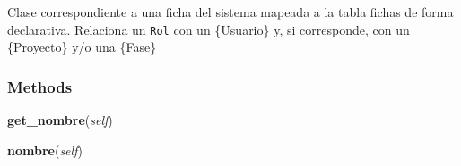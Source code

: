 Clase correspondiente a una ficha del sistema mapeada a la tabla fichas de 
forma declarativa. Relaciona un \texttt{Rol} con un \{Usuario\} y, si 
corresponde, con un \{Proyecto\} y/o una \{Fase\}



  \subsubsection{Methods}

    \label{saip:model:auth:Ficha:get_nombre}

    \vspace{0.5ex}

\hspace{.8\funcindent}\begin{boxedminipage}{\funcwidth}

    \raggedright \textbf{get\_nombre}(\textit{self})

\setlength{\parskip}{2ex}
\setlength{\parskip}{1ex}
    \end{boxedminipage}

    \label{saip:model:auth:Ficha:nombre}

    \vspace{0.5ex}

\hspace{.8\funcindent}\begin{boxedminipage}{\funcwidth}

    \raggedright \textbf{nombre}(\textit{self})

\setlength{\parskip}{2ex}
\setlength{\parskip}{1ex}
    \end{boxedminipage}



